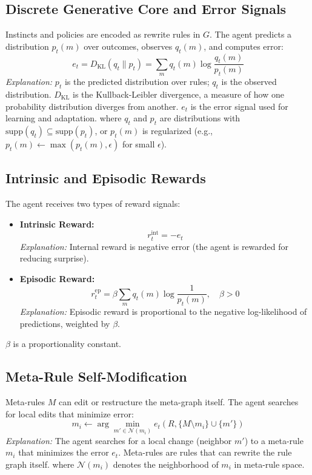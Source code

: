 \documentclass[11pt]{article}
\begin{document}
\subsection{Discrete Generative Core and Error Signals}
Instincts and policies are encoded as rewrite rules in $G$. The agent predicts a distribution $p_t(m)$ over outcomes, observes $q_t(m)$, and computes error:
\[
  e_t = D_{\mathrm{KL}}(q_t\|p_t) = \sum_m q_t(m) \log \frac{q_t(m)}{p_t(m)}
\]
\textit{Explanation:} $p_t$ is the predicted distribution over rules; $q_t$ is the observed distribution. $D_{\mathrm{KL}}$ is the Kullback-Leibler divergence, a measure of how one probability distribution diverges from another. $e_t$ is the error signal used for learning and adaptation.
where $q_t$ and $p_t$ are distributions with $\mathrm{supp}(q_t) \subseteq \mathrm{supp}(p_t)$, or $p_t(m)$ is regularized (e.g., $p_t(m) \leftarrow \max(p_t(m), \epsilon)$ for small $\epsilon$).

\subsection{Intrinsic and Episodic Rewards}
The agent receives two types of reward signals:
\begin{itemize}
  \item \textbf{Intrinsic Reward:}
  \[
    r^{\mathrm{int}}_t = -e_t
  \]
  \textit{Explanation:} Internal reward is negative error (the agent is rewarded for reducing surprise).
  \item \textbf{Episodic Reward:}
  \[
    r^{\mathrm{ep}}_t = \beta \sum_m q_t(m)\log\frac{1}{p_t(m)}, \quad \beta > 0
  \]
  \textit{Explanation:} Episodic reward is proportional to the negative log-likelihood of predictions, weighted by $\beta$.
\end{itemize}
$\beta$ is a proportionality constant.

\subsection{Meta-Rule Self-Modification}
Meta-rules $M$ can edit or restructure the meta-graph itself. The agent searches for local edits that minimize error:
\[
  m_i \leftarrow \arg\min_{m' \in \mathcal{N}(m_i)} e_t(R, \{M \setminus m_i\} \cup \{m'\})
\]
\textit{Explanation:} The agent searches for a local change (neighbor $m'$) to a meta-rule $m_i$ that minimizes the error $e_t$. Meta-rules are rules that can rewrite the rule graph itself.
where $\mathcal{N}(m_i)$ denotes the neighborhood of $m_i$ in meta-rule space.
\end{document}
